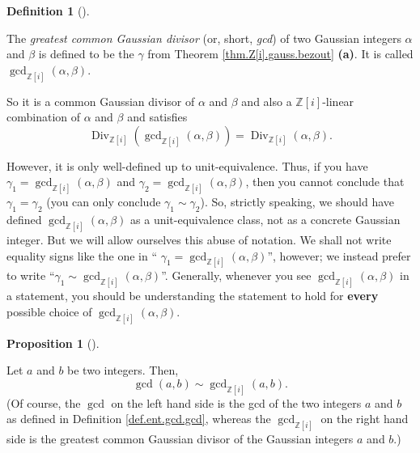 \documentclass[numbers=enddot,12pt,final,onecolumn,notitlepage]{scrartcl}%
\numberwithin{exer}{subsection}
\theoremstyle{definition}
\newtheorem{prop}[theo]{Proposition}
\newenvironment{proposition}[1][]
{\begin{prop}[#1]\begin{leftbar}}
{\end{leftbar}\end{prop}}
\newtheorem{defi}[theo]{Definition}
\newenvironment{definition}[1][]
{\begin{defi}[#1]\begin{leftbar}}
{\end{leftbar}\end{defi}}
\begin{document}
\begin{definition}
\label{def.Z[i].gauss.gcd}The \textit{greatest common Gaussian divisor} (or,
short, \textit{gcd}) of two Gaussian integers $\alpha$ and $\beta$ is defined
to be the $\gamma$ from Theorem \ref{thm.Z[i].gauss.bezout} \textbf{(a)}. It
is called $\gcd\nolimits_{\mathbb{Z}\left[  i\right]  }\left(  \alpha
,\beta\right)  $.

So it is a common Gaussian divisor of $\alpha$ and $\beta$ and also a
$\mathbb{Z}\left[  i\right]  $-linear combination of $\alpha$ and $\beta$ and
satisfies
\begin{equation}
\operatorname*{Div}\nolimits_{\mathbb{Z}\left[  i\right]  }\left(
\gcd\nolimits_{\mathbb{Z}\left[  i\right]  }\left(  \alpha,\beta\right)
\right)  =\operatorname*{Div}\nolimits_{\mathbb{Z}\left[  i\right]  }\left(
\alpha,\beta\right)  . \label{eq.def.Z[i].gauss.gcd.Div=Div}%
\end{equation}


However, it is only well-defined up to unit-equivalence. Thus, if you have
$\gamma_{1}=\gcd\nolimits_{\mathbb{Z}\left[  i\right]  }\left(  \alpha
,\beta\right)  $ and $\gamma_{2}=\gcd\nolimits_{\mathbb{Z}\left[  i\right]
}\left(  \alpha,\beta\right)  $, then you cannot conclude that $\gamma
_{1}=\gamma_{2}$ (you can only conclude $\gamma_{1}\sim\gamma_{2}$). So,
strictly speaking, we should have defined $\gcd\nolimits_{\mathbb{Z}\left[
i\right]  }\left(  \alpha,\beta\right)  $ as a unit-equivalence class, not as
a concrete Gaussian integer. But we will allow ourselves this abuse of
notation. We shall not write equality signs like the one in \textquotedblleft%
$\gamma_{1}=\gcd\nolimits_{\mathbb{Z}\left[  i\right]  }\left(  \alpha
,\beta\right)  $\textquotedblright, however; we instead prefer to write
\textquotedblleft$\gamma_{1}\sim\gcd\nolimits_{\mathbb{Z}\left[  i\right]
}\left(  \alpha,\beta\right)  $\textquotedblright. Generally, whenever you see
$\gcd\nolimits_{\mathbb{Z}\left[  i\right]  }\left(  \alpha,\beta\right)  $ in
a statement, you should be understanding the statement to hold for
\textbf{every} possible choice of $\gcd\nolimits_{\mathbb{Z}\left[  i\right]
}\left(  \alpha,\beta\right)  $.
\end{definition}

\begin{proposition}
\label{prop.Z[i].gauss.gcd=gcd}Let $a$ and $b$ be two integers. Then,%
\[
\gcd\left(  a,b\right)  \sim\gcd\nolimits_{\mathbb{Z}\left[  i\right]
}\left(  a,b\right)  .
\]
(Of course, the $\gcd$ on the left hand side is the gcd of the two integers
$a$ and $b$ as defined in Definition \ref{def.ent.gcd.gcd}, whereas the
$\gcd\nolimits_{\mathbb{Z}\left[  i\right]  }$ on the right hand side is the
greatest common Gaussian divisor of the Gaussian integers $a$ and $b$.)
\end{proposition}
\end{document}
